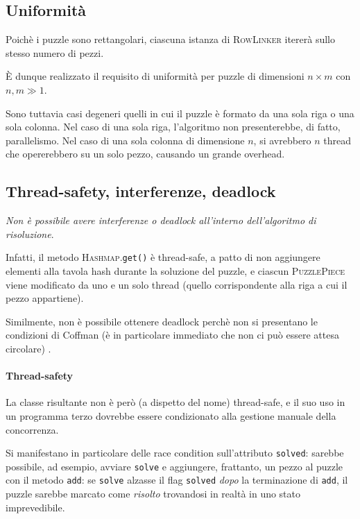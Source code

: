 \documentclass[a4paper]{article}
\newcommand{\Classname}[1]{\textsc{#1}}
\newcommand{\Methodname}[1]{\texttt{#1}}
\begin{document}
\subsection{Uniformit\`a}
Poich\`e i puzzle sono rettangolari, ciascuna istanza di \Classname{RowLinker} iterer\`a sullo stesso numero di pezzi.

\`E dunque realizzato il requisito di uniformit\`a per puzzle di dimensioni $n \times m$ con $n, m \gg 1$.

Sono tuttavia casi degeneri quelli in cui il puzzle \`e formato da una sola riga o una sola colonna.
Nel caso di una sola riga, l'algoritmo non presenterebbe, di fatto, parallelismo.
Nel caso di una sola colonna di dimensione $n$, si avrebbero $n$ thread che opererebbero su un solo pezzo, causando un grande overhead.

\subsection{Thread-safety, interferenze, deadlock}
\emph{Non \`e possibile avere interferenze o deadlock all'interno dell'algoritmo di risoluzione}.

Infatti, il metodo \Classname{Hashmap}.\Methodname{get()} \`e thread-safe, a patto di non aggiungere elementi alla tavola hash durante la soluzione del puzzle, e ciascun \Classname{PuzzlePiece} viene modificato da uno e un solo thread (quello corrispondente alla riga a cui il pezzo appartiene).

Similmente, non \`e possibile ottenere deadlock perch\`e non si presentano le condizioni di Coffman (\`e in particolare immediato che non ci pu\`o essere attesa circolare) \cite{tanenbaum2001modern}.

\paragraph{Thread-safety} La classe risultante non \`e per\`o (a dispetto del nome) thread-safe, e il suo uso in un programma terzo dovrebbe essere condizionato alla gestione manuale della concorrenza.

Si manifestano in particolare delle race condition sull'attributo \Methodname{solved}: sarebbe possibile, ad esempio, avviare \Methodname{solve} e aggiungere, frattanto, un pezzo al puzzle con il metodo \Methodname{add}: se \Methodname{solve} alzasse il flag \Methodname{solved} \emph{dopo} la terminazione di \Methodname{add}, il puzzle sarebbe marcato come \emph{risolto} trovandosi in realt\`a in uno stato imprevedibile.
\end{document}
